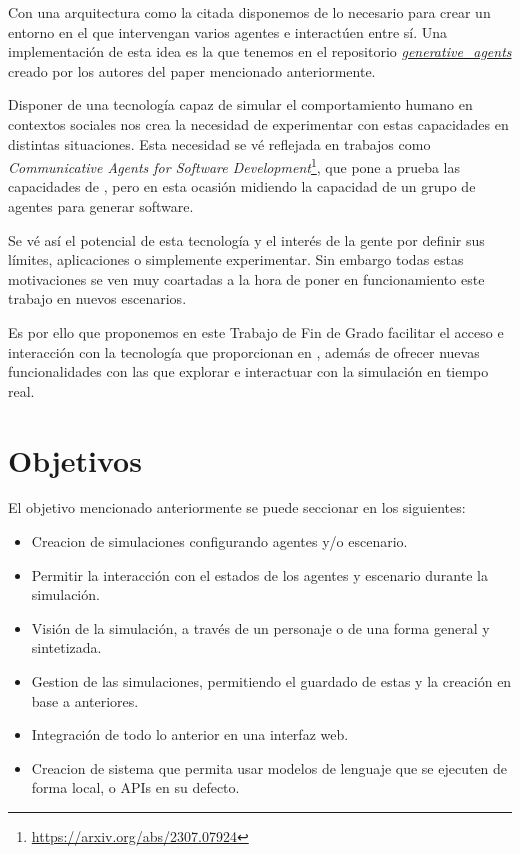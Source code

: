 Con una arquitectura como la citada disponemos de lo necesario para crear un entorno en el que intervengan varios agentes e interactúen entre sí. Una implementación de esta idea es la que tenemos en el repositorio \href{https://github.com/joonspk-research/generative_agents}{\textit{generative\_agents}} creado por los autores del paper mencionado anteriormente.

Disponer de una tecnología capaz de simular el comportamiento humano en contextos sociales nos crea la necesidad de experimentar con estas capacidades en distintas situaciones. Esta necesidad se vé reflejada en trabajos como \textit{Communicative Agents for Software Development}\footnote{\url{https://arxiv.org/abs/2307.07924}}, que pone a prueba las capacidades de \ga, pero en esta ocasión midiendo la capacidad de un grupo de agentes para generar software.

Se vé así el potencial de esta tecnología y el interés de la gente por definir sus límites, aplicaciones o simplemente experimentar.
Sin embargo todas estas motivaciones se ven muy coartadas a la hora de poner en funcionamiento este trabajo en nuevos escenarios.

Es por ello que proponemos en este Trabajo de Fin de Grado facilitar el acceso e interacción con la tecnología que proporcionan en \ga, además de ofrecer nuevas funcionalidades con las que explorar e interactuar con la simulación en tiempo real.

\section{Objetivos}
El objetivo mencionado anteriormente se puede seccionar en los siguientes:
\begin{itemize}
\item Creacion de simulaciones configurando agentes y/o escenario.
\item Permitir la interacción con el estados de los agentes y escenario durante la simulación.
\item Visión de la simulación, a través de un personaje o de una forma general y sintetizada.
\item Gestion de las simulaciones, permitiendo el guardado de estas y la creación en base a anteriores.
\item Integración de todo lo anterior en una interfaz web.
\item Creacion de sistema que permita usar modelos de lenguaje que se ejecuten de forma local, o APIs en su defecto.
\end{itemize}


